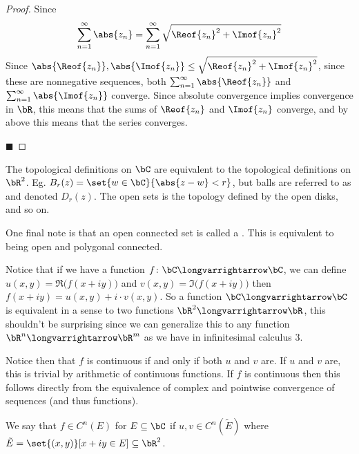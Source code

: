 \documentclass[10pt]{article}
\begin{document}
\begin{proof}

    Since
    \[ \sum_{n=1}^\infty \abs{z_n}=\sum_{n=1}^\infty\sqrt{\Reof{z_n}^2+\Imof{z_n}^2} \]
    Since $\abs{\Reof{z_n}},\abs{\Imof{z_n}}\leq\sqrt{\Reof{z_n}^2+\Imof{z_n}^2}$, since these are nonnegative sequences, both $\sum_{n=1}^\infty\abs{\Reof{z_n}}$ and $\sum_{n=1}^\infty\abs{\Imof{z_n}}$
    converge.
    Since absolute convergence implies convergence in $\bR$, this means that the sums of $\Reof{z_n}$ and $\Imof{z_n}$ converge, and by above this means that the series converges.

    \hfill$\blacksquare$

\end{proof}

\begin{note}

    The topological definitions on $\bC$ are equivalent to the topological definitions on $\bR^2$.
    Eg. $B_r(z)=\set{w\in\bC}{\abs{z-w}<r}$, but balls are referred to as  and denoted $D_r(z)$.
    The open sets is the topology defined by the open disks, and so on.

    One final note is that an open connected set is called a .
    This is equivalent to being open and polygonal connected.

\end{note}

Notice that if we have a function $f\colon\bC\longvarrightarrow\bC$, we can define $u(x,y)=\Re\bigl(f(x+iy)\bigr)$ and $v(x,y)=\Im\bigl(f(x+iy)\bigr)$ then $f(x+iy)=u(x,y)+i\cdot v(x,y)$.
So a function $\bC\longvarrightarrow\bC$ is equivalent in a sense to two functions $\bR^2\longvarrightarrow\bR$, this shouldn't be surprising since we can generalize this to any function
$\bR^n\longvarrightarrow\bR^m$ as we have in infinitesimal calculus $3$.

Notice then that $f$ is continuous if and only if both $u$ and $v$ are.
If $u$ and $v$ are, this is trivial by arithmetic of continuous functions.
If $f$ is continuous then this follows directly from the equivalence of complex and pointwise convergence of sequences (and thus functions).

\begin{defn*}

    We say that $f\in C^n(E)$ for $E\subseteq\bC$ if $u,v\in C^n(\tilde E)$ where $\tilde E=\set{(x,y)}[x+iy\in E]\subseteq\bR^2$.

\end{defn*}
\end{document}
